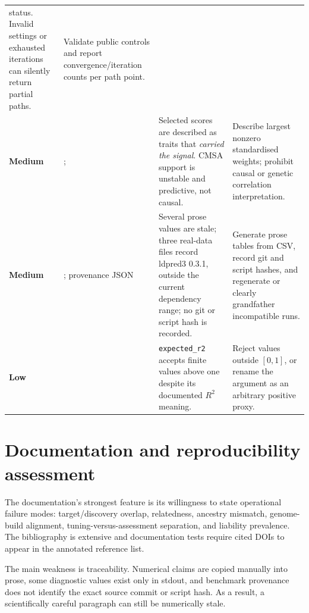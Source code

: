 \documentclass[10pt,a4paper]{article}
\newcommand{\code}[1]{\texttt{#1}}
\newcommand{\Rtwo}{\(R^2\)}
\newcommand{\finding}[2]{\textbf{\textcolor{#1}{#2}}}
\begin{document}
\begin{longtable}{@{}L{15mm}L{39mm}L{48mm}L{54mm}@{}}
status. Invalid settings or exhausted iterations can silently return partial
paths. &
Validate public controls and report convergence/iteration counts per path
point. \\
\finding{Amber}{Medium} &
;  &
Selected scores are described as traits that \emph{carried the signal}. CMSA
support is unstable and predictive, not causal. &
Describe largest nonzero standardised weights; prohibit causal or genetic
correlation interpretation. \\
\finding{Amber}{Medium} &
; provenance JSON &
Several prose values are stale; three real-data files record ldpred3 0.3.1,
outside the current dependency range; no git or script hash is recorded. &
Generate prose tables from CSV, record git and script hashes, and regenerate or
clearly grandfather incompatible runs. \\
\finding{DeepBlue}{Low} &
 &
\code{expected\_r2} accepts finite values above one despite its documented
\Rtwo{} meaning. &
Reject values outside \([0,1]\), or rename the argument as an arbitrary
positive proxy. \\
\bottomrule
\end{longtable}

\section{Documentation and reproducibility assessment}
\label{sec:documentation}

The documentation's strongest feature is its willingness to state operational
failure modes: target/discovery overlap, relatedness, ancestry mismatch,
genome-build alignment, tuning-versus-assessment separation, and liability
prevalence. The bibliography is extensive and documentation tests require
cited DOIs to appear in the annotated reference list.

The main weakness is traceability. Numerical claims are copied manually into
prose, some diagnostic values exist only in stdout, and benchmark provenance
does not identify the exact source commit or script hash. As a result, a
scientifically careful paragraph can still be numerically stale.
\end{document}
